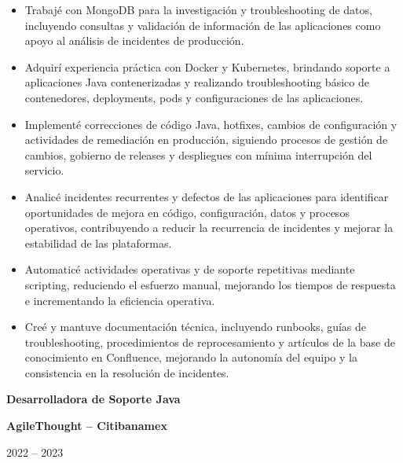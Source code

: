 \documentclass[10pt,letterpaper]{article}
\newcommand{\jobtitle}[1]{
    {\bfseries #1}
}
\newcommand{\company}[1]{
    {\bfseries\color{DarkGray} #1}
}
\newcommand{\jobdate}[1]{
    {\color{MediumGray} #1}
}
\begin{document}
\begin{itemize}
    \item Trabajé con MongoDB para la investigación y troubleshooting de datos, incluyendo consultas y validación de información de las aplicaciones como apoyo al análisis de incidentes de producción.

    \item Adquirí experiencia práctica con Docker y Kubernetes, brindando soporte a aplicaciones Java contenerizadas y realizando troubleshooting básico de contenedores, deployments, pods y configuraciones de las aplicaciones.

    \item Implementé correcciones de código Java, hotfixes, cambios de configuración y actividades de remediación en producción, siguiendo procesos de gestión de cambios, gobierno de releases y despliegues con mínima interrupción del servicio.

    \item Analicé incidentes recurrentes y defectos de las aplicaciones para identificar oportunidades de mejora en código, configuración, datos y procesos operativos, contribuyendo a reducir la recurrencia de incidentes y mejorar la estabilidad de las plataformas.

    \item Automaticé actividades operativas y de soporte repetitivas mediante scripting, reduciendo el esfuerzo manual, mejorando los tiempos de respuesta e incrementando la eficiencia operativa.

    \item Creé y mantuve documentación técnica, incluyendo runbooks, guías de troubleshooting, procedimientos de reprocesamiento y artículos de la base de conocimiento en Confluence, mejorando la autonomía del equipo y la consistencia en la resolución de incidentes.

\end{itemize}


\jobtitle{Desarrolladora de Soporte Java} \textbar{}
\company{AgileThought -- Citibanamex}
\hfill \textbar{}
\jobdate{2022 -- 2023}
\end{document}
